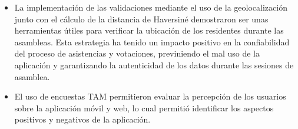 \begin{itemize}
    \item La implementación de las validaciones mediante el uso de la geolocalización junto con el cálculo de la distancia de Haversiné demostraron ser unas herramientas útiles para verificar la ubicación de los residentes durante las asambleas.
    Esta estrategia ha tenido un impacto positivo en la confiabilidad del proceso de asistencias y votaciones, previniendo el mal uso de la aplicación y garantizando la autenticidad de los datos durante las sesiones de asamblea.
    \item El uso de encuestas TAM permitieron evaluar la percepción de los usuarios sobre la aplicación móvil y web, lo cual permitió identificar los aspectos positivos y negativos de la aplicación.
\end{itemize}